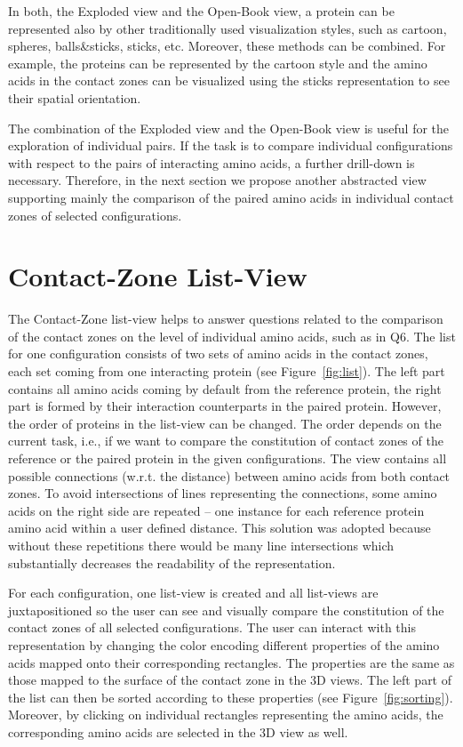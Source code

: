 \documentclass{bmcart}
\def\OpBook {Open-Book view\xspace}
\def\ExpView {Exploded view\xspace}
\def\CoZoListView {Contact-Zone list-view\xspace}
\begin{document}
In both, the \ExpView and the \OpBook, a protein can be represented also by other traditionally used visualization styles, such as cartoon, spheres, balls\&sticks, sticks, etc.
Moreover, these methods can be combined. 
For example, the proteins can be represented by the cartoon style and the amino acids in the contact zones can be visualized using the sticks representation to see their spatial orientation.%

The combination of the \ExpView and the \OpBook is useful for the exploration of individual pairs.
If the task is to compare individual configurations with respect to the pairs of interacting amino acids, a further drill-down is necessary.
Therefore, in the next section we propose another abstracted view supporting mainly the comparison of the paired amino acids in individual contact zones of selected configurations.


\section{Contact-Zone List-View}
The \CoZoListView helps to answer questions related to the comparison of the contact zones on the level of individual amino acids, such as in Q6.
The list for one configuration consists of two sets of amino acids in the contact zones, each set coming from one interacting protein (see Figure~\ref{fig:list}).
The left part contains all amino acids coming by default from the reference protein, the right part is formed by their interaction counterparts in the paired protein.
However, the order of proteins in the list-view can be changed.
The order depends on the current task, i.e., if we want to compare the constitution of contact zones of the reference or the paired protein in the given configurations.
The view contains all possible connections (w.r.t. the distance) between amino acids from both contact zones.
To avoid intersections of lines representing the connections, some amino acids on the right side are repeated -- one instance for each reference protein amino acid within a user defined distance. 
This solution was adopted because without these repetitions there would be many line intersections which substantially decreases the readability of the representation.

For each configuration, one list-view is created and all list-views are juxtapositioned so the user can see and visually compare the constitution of the contact zones of all selected configurations.
The user can interact with this representation by changing the color encoding different properties of the amino acids mapped onto their corresponding rectangles.
The properties are the same as those mapped to the surface of the contact zone in the 3D views.
The left part of the list can then be sorted according to these properties (see Figure~\ref{fig:sorting}).
Moreover, by clicking on individual rectangles representing the amino acids, the corresponding amino acids are selected in the 3D view as well.
\end{document}
